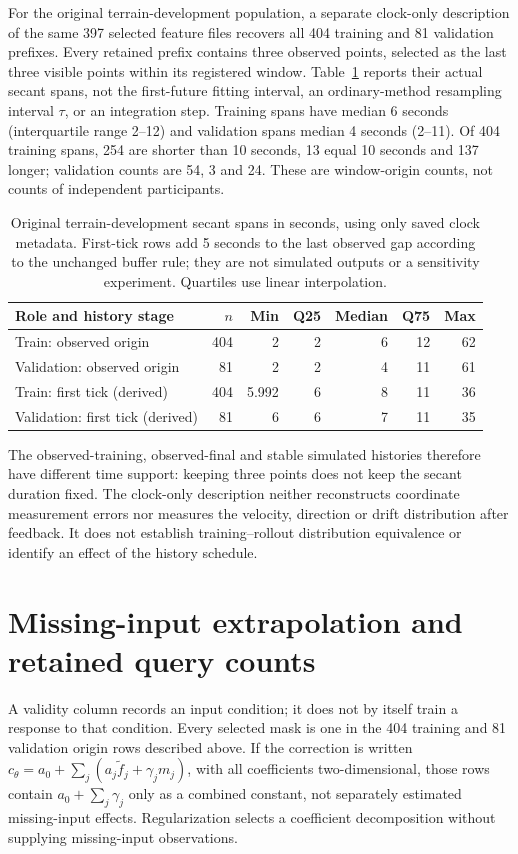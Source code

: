 For the original terrain-development population, a separate clock-only
description of the same 397 selected feature files recovers all 404 training
and 81 validation prefixes. Every retained prefix contains three observed
points, selected as the last three visible points within its registered
window. Table~\ref{tab:development-history-spans} reports their actual secant
spans, not the first-future fitting interval, an ordinary-method resampling
interval \(\tau\), or an integration step. Training spans have median
6 seconds (interquartile range 2--12) and validation spans median 4 seconds
(2--11). Of 404 training spans, 254 are shorter than 10 seconds, 13 equal
10 seconds and 137 longer; validation counts are 54, 3 and 24. These are
window-origin counts, not counts of independent participants.

\begin{table}[htbp]
\centering\small
\caption{Original terrain-development secant spans in seconds, using only
saved clock metadata. First-tick rows add 5 seconds to the last observed
gap according to the unchanged buffer rule; they are not simulated outputs
or a sensitivity experiment. Quartiles use linear interpolation.}
\label{tab:development-history-spans}\hypertarget{tab:development-history-spans}{}
\begin{tabular}{lrrrrrr}
\toprule
Role and history stage & \(n\) & Min & Q25 & Median & Q75 & Max\\
\midrule
Train: observed origin & 404 & 2 & 2 & 6 & 12 & 62\\
Validation: observed origin & 81 & 2 & 2 & 4 & 11 & 61\\
Train: first tick (derived) & 404 & 5.992 & 6 & 8 & 11 & 36\\
Validation: first tick (derived) & 81 & 6 & 6 & 7 & 11 & 35\\
\bottomrule
\end{tabular}
\end{table}

The observed-training, observed-final and stable simulated histories
therefore have different time support: keeping three points does not keep
the secant duration fixed. The clock-only description neither reconstructs
coordinate measurement errors nor measures the velocity, direction or drift
distribution after feedback. It does not establish training--rollout
distribution equivalence or identify an effect of the history schedule.


\section{Missing-input extrapolation and retained query counts}
\label{sec:missing-input-scope}\hypertarget{sec:missing-input-scope}{}
A validity column records an input condition; it does not by itself train a
response to that condition. Every selected mask is one in the 404 training
and 81 validation origin rows described above. If the correction is written
\(c_\theta=a_0+\sum_j(a_j\widetilde f_j+\gamma_j m_j)\), with all coefficients
two-dimensional, those rows contain \(a_0+\sum_j\gamma_j\) only as a combined
constant, not separately estimated missing-input effects.
Regularization selects a coefficient decomposition without supplying
missing-input observations.

